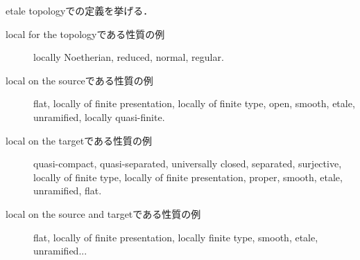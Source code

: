 \documentclass[a4paper, dvipdfmx]{jsarticle}
\begin{document}
\begin{Example}
    etale topologyでの定義を挙げる．
    \begin{description}
    \item[local for the topologyである性質の例] \mnewline
        locally Noetherian, reduced, normal, regular.

    \item[local on the sourceである性質の例] \mnewline
        flat, locally of finite presentation, locally of finite type, open,
        smooth, etale, unramified, locally quasi-finite.

    \item[local on the targetである性質の例] \mnewline
        quasi-compact, quasi-separated, universally closed, separated, surjective,
        locally of finite type, locally of finite presentation,
        proper, smooth, etale, unramified, flat.

    \item[local on the source and targetである性質の例] \mnewline
        flat, locally of finite presentation, locally finite type,
        smooth, etale, unramified...
    \end{description}
\end{Example}
\end{document}
